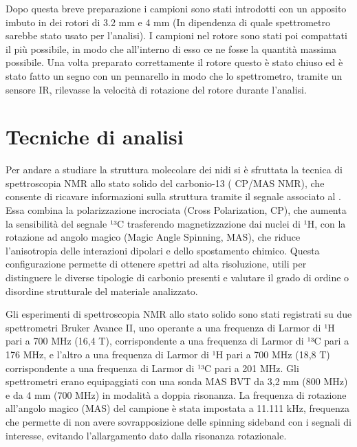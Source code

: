 Dopo questa breve preparazione i campioni sono stati introdotti con un apposito imbuto in dei rotori di 3.2 mm e 4 mm (In dipendenza di quale spettrometro sarebbe stato usato per l'analisi).
I campioni nel rotore sono stati poi compattati il più possibile, in modo che all'interno di esso ce ne fosse la quantità massima possibile.
Una volta preparato correttamente il rotore questo è stato chiuso ed è stato fatto un segno con un pennarello in modo che lo spettrometro, tramite un sensore IR, rilevasse la velocità di rotazione del rotore durante l'analisi.

\section{Tecniche di analisi}
Per andare a studiare la struttura molecolare dei nidi si è sfruttata la tecnica di spettroscopia NMR allo stato solido del carbonio-13 ( CP/MAS NMR), che consente di ricavare informazioni sulla struttura tramite il segnale associato al .
Essa combina la polarizzazione incrociata (Cross Polarization, CP), che aumenta la sensibilità del segnale ¹³C trasferendo magnetizzazione dai nuclei di ¹H, con la rotazione ad angolo magico (Magic Angle Spinning, MAS), che riduce l’anisotropia delle interazioni dipolari e dello spostamento chimico.
Questa configurazione permette di ottenere spettri ad alta risoluzione, utili per distinguere le diverse tipologie di carbonio presenti e valutare il grado di ordine o disordine strutturale del materiale analizzato.

Gli esperimenti di spettroscopia NMR allo stato solido sono stati registrati su due spettrometri Bruker Avance II, uno operante a una frequenza di Larmor di ¹H pari a 700 MHz (16,4 T), corrispondente a una frequenza di Larmor di ¹³C pari a 176 MHz, e l'altro a una frequenza di Larmor di ¹H pari a 700 MHz (18,8 T) corrispondente a una frequenza di Larmor di ¹³C pari a 201 MHz. 
Gli spettrometri erano equipaggiati con una sonda MAS BVT da 3,2 mm (800 MHz) e da 4 mm (700 MHz) in modalità a doppia risonanza. 
La frequenza di rotazione all’angolo magico (MAS) del campione è stata impostata a 11.111 kHz, frequenza che permette di non avere sovrapposizione delle spinning sideband con i segnali di interesse, evitando l'allargamento dato dalla risonanza rotazionale. \cite{RALEIGH198871}

